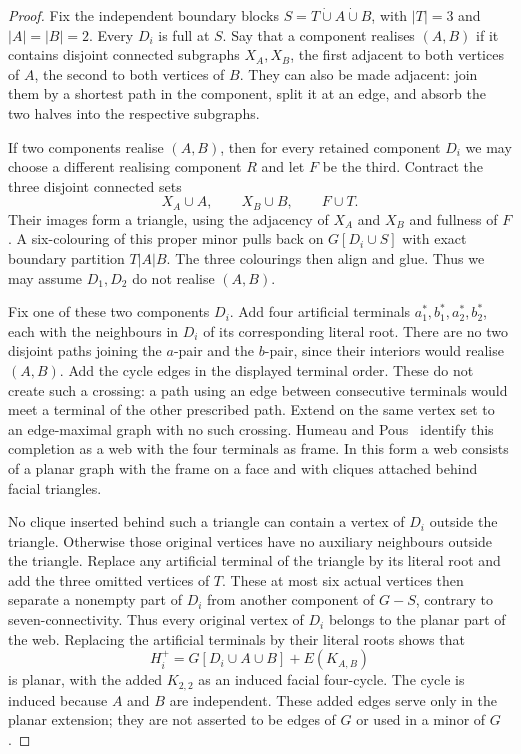 \begin{proof}
Fix the independent boundary blocks
$S=T\mathbin{\dot\cup}A\mathbin{\dot\cup}B$, with
$|T|=3$ and $|A|=|B|=2$.  Every $D_i$ is full at $S$.
Say that a component realises $(A,B)$ if it contains disjoint connected
subgraphs $X_A,X_B$, the first adjacent to both vertices of $A$, the
second to both vertices of $B$.  They can also be made adjacent: join
them by a shortest path in the component, split it at an edge, and absorb
the two halves into the respective subgraphs.

If two components realise $(A,B)$, then for every retained component
$D_i$ we may choose a different realising component $R$ and let $F$ be
the third.  Contract the three disjoint connected sets
\[
                X_A\cup A,\qquad X_B\cup B,\qquad F\cup T.
\]
Their images form a triangle, using the adjacency of $X_A$ and $X_B$
and fullness of $F$.  A six-colouring of this proper minor pulls back on
$G[D_i\cup S]$ with exact boundary partition $T|A|B$.  The three
colourings then align and glue.  Thus we may assume $D_1,D_2$ do not
realise $(A,B)$.

Fix one of these two components $D_i$.  Add four artificial terminals
$a_1^*,b_1^*,a_2^*,b_2^*$, each with the neighbours in $D_i$ of its
corresponding literal root.  There are no two disjoint paths joining the
$a$-pair and the $b$-pair, since their interiors would realise $(A,B)$.
Add the cycle edges in the displayed terminal order.  These do not
create such a crossing: a path using an edge between consecutive
terminals would meet a terminal of the other prescribed path.  Extend
on the same vertex set to an edge-maximal graph with no such crossing.
Humeau and Pous~\cite[Theorem~1.3]{HumeauPous2025} identify this completion
as a web with the four terminals as frame.  In this form a web consists
of a planar graph with the frame on a face and with cliques attached
behind facial triangles.

No clique inserted behind such a triangle can contain a vertex of $D_i$
outside the triangle.  Otherwise those original vertices have no
auxiliary neighbours outside the triangle.  Replace any artificial
terminal of the triangle by its literal root and add the three omitted
vertices of $T$.  These at most six actual vertices then separate a
nonempty part of $D_i$ from another component of $G-S$, contrary to
seven-connectivity.  Thus every original vertex of $D_i$ belongs to the
planar part of the web.  Replacing the artificial terminals by their
literal roots shows that
\[
                   H_i^+=G[D_i\cup A\cup B]+E(K_{A,B})
\]
is planar, with the added $K_{2,2}$ as an induced facial four-cycle.
The cycle is induced because $A$ and $B$ are independent.  These added
edges serve only in the planar extension; they are not asserted to be
edges of $G$ or used in a minor of $G$.


\end{proof}
